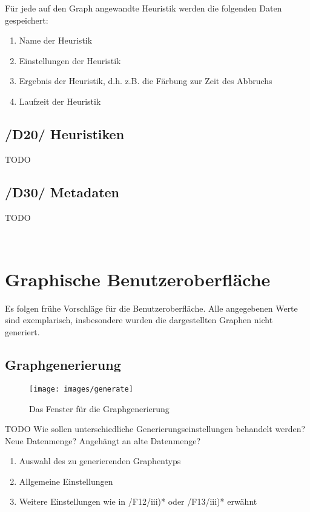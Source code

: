 \documentclass{article}
\begin{document}
	Für jede auf den Graph angewandte Heuristik werden die folgenden Daten gespeichert:
	\begin{enumerate}[--]
		\item{Name der Heuristik}
		\item{Einstellungen der Heuristik}
		\item{Ergebnis der Heuristik, d.h. z.B. die Färbung zur Zeit des Abbruchs}
		\item{Laufzeit der Heuristik}
	\end{enumerate}
	
	\subsection*{/D20/ Heuristiken} \label{d20} 
	TODO
	
	\subsection*{/D30/ Metadaten} \label{d30} 
	TODO
	
	~\newpage
	\section{Graphische Benutzeroberfläche}
	Es folgen frühe Vorschläge für die Benutzeroberfläche. Alle angegebenen Werte sind exemplarisch, insbesondere wurden die dargestellten Graphen nicht generiert.
	
	\subsection{Graphgenerierung}
	\begin{figure}[!h]
		\centering
		\texttt{[image: images/generate]}
		\caption{Das Fenster für die Graphgenerierung}
	\end{figure}
	
	TODO Wie sollen unterschiedliche Generierungseinstellungen behandelt werden? Neue Datenmenge? Angehängt an alte Datenmenge?
	
	\begin{enumerate}[(1)]
		\item{Auswahl des zu generierenden Graphentyps}
		\item{Allgemeine Einstellungen}
		\item{Weitere Einstellungen wie in /F12/iii)* oder /F13/iii)* erwähnt}
	\end{enumerate}
	
\end{document}
